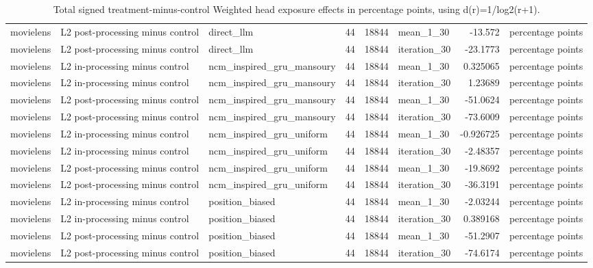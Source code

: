 \begin{table}[htbp!]
\begin{tabular}{lllrrlrl}
movielens & L2 post-processing minus control & direct\_llm & 44 & 18844 & mean\_1\_30 & -13.572 & percentage points \\
movielens & L2 post-processing minus control & direct\_llm & 44 & 18844 & iteration\_30 & -23.1773 & percentage points \\
movielens & L2 in-processing minus control & ncm\_inspired\_gru\_mansoury & 44 & 18844 & mean\_1\_30 & 0.325065 & percentage points \\
movielens & L2 in-processing minus control & ncm\_inspired\_gru\_mansoury & 44 & 18844 & iteration\_30 & 1.23689 & percentage points \\
movielens & L2 post-processing minus control & ncm\_inspired\_gru\_mansoury & 44 & 18844 & mean\_1\_30 & -51.0624 & percentage points \\
movielens & L2 post-processing minus control & ncm\_inspired\_gru\_mansoury & 44 & 18844 & iteration\_30 & -73.6009 & percentage points \\
movielens & L2 in-processing minus control & ncm\_inspired\_gru\_uniform & 44 & 18844 & mean\_1\_30 & -0.926725 & percentage points \\
movielens & L2 in-processing minus control & ncm\_inspired\_gru\_uniform & 44 & 18844 & iteration\_30 & -2.48357 & percentage points \\
movielens & L2 post-processing minus control & ncm\_inspired\_gru\_uniform & 44 & 18844 & mean\_1\_30 & -19.8692 & percentage points \\
movielens & L2 post-processing minus control & ncm\_inspired\_gru\_uniform & 44 & 18844 & iteration\_30 & -36.3191 & percentage points \\
movielens & L2 in-processing minus control & position\_biased & 44 & 18844 & mean\_1\_30 & -2.03244 & percentage points \\
movielens & L2 in-processing minus control & position\_biased & 44 & 18844 & iteration\_30 & 0.389168 & percentage points \\
movielens & L2 post-processing minus control & position\_biased & 44 & 18844 & mean\_1\_30 & -51.2907 & percentage points \\
movielens & L2 post-processing minus control & position\_biased & 44 & 18844 & iteration\_30 & -74.6174 & percentage points \\
\hline
\end{tabular}
\caption{Total signed treatment-minus-control Weighted head exposure effects in percentage points, using d(r)=1/log2(r+1).}
\label{chap:results:tab:rq4_weighted_head_exposure_effects}
\end{table}
